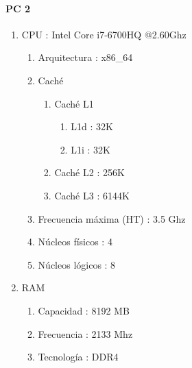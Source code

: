 \documentclass[12pt,spanish]{article}
\begin{document}
\paragraph{PC 2}
\label{sec:pc2}
\begin{enumerate}
\item CPU : Intel Core i7-6700HQ @2.60Ghz
\begin{enumerate}
	\item Arquitectura : x86\_64
	\item Caché
	\begin{enumerate}
		\item Caché L1
		\begin{enumerate}
			\item L1d : 32K
			\item L1i : 32K
		\end{enumerate}
		\item Caché L2 : 256K
		\item Caché L3 : 6144K
	\end{enumerate}
	\item Frecuencia máxima (HT) : 3.5 Ghz
	\item Núcleos físicos : 4
	\item Núcleos lógicos : 8
\end{enumerate}
\item RAM
\begin{enumerate}
	\item Capacidad : 8192 MB
 	\item Frecuencia : 2133 Mhz
 	\item Tecnología : DDR4
\end{enumerate}
\end{enumerate}
\end{document}
